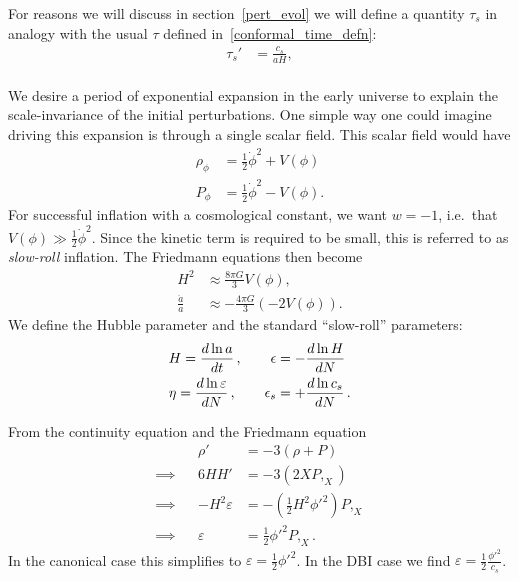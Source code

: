     For reasons we will discuss in section~\ref{pert_evol} we will
    define a quantity $\tau_s$
    in analogy with the usual $\tau$ defined in~\eqref{conformal_time_defn}:
    \begin{align}\label{tausdef}
        \tau_s'&=\frac{c_s}{aH},\\
    \end{align}


    We desire a period of exponential expansion in the early universe to explain the
    scale-invariance of the initial perturbations.
    One simple way one could imagine driving this expansion is through a single
    scalar field. This scalar field would have
    \begin{align}
        \rho_\phi &= \frac{1}{2}\dot{\phi}^2+V(\phi)\\
        P_\phi &= \frac{1}{2}\dot{\phi}^2-V(\phi).
    \end{align}
    For successful inflation with a cosmological constant, we want $w=-1$,
    i.e.\ that $V(\phi)\gg\frac{1}{2}\dot{\phi}^2$. Since the kinetic term is required to
    be small, this is referred to as \textit{slow-roll} inflation.
    The Friedmann equations then become
    \begin{align}
        H^2 &\approx \frac{8\pi G}{3}V(\phi),\\
        \frac{\ddot{a}}{a} &\approx -\frac{4\pi G}{3}\left(-2V(\phi)\right).
    \end{align}
We define the Hubble parameter and the standard ``slow-roll'' parameters:
\begin{equation}
\label{slowrollparams}
\begin{split}
    H = \frac{d\ln a}{dt}	\,,
    \qquad
    \epsilon &= -\frac{d\ln H}{dN}	\\
    \eta = \frac{d\ln \varepsilon}{dN}	\,,
    \qquad
    \epsilon_s &= +\frac{d\ln c_s}{dN}	\,.
\end{split}
\end{equation}

From the continuity equation and the Friedmann equation
\begin{align}
    &&\rho' &= -3(\rho+P)\\
    \implies&&6HH' &= -3(2X P,_{X})\\
    \implies&&-H^2\varepsilon &= -\left(\frac{1}{2}H^2{\phi'}^2\right) P,_{X}\\
    \implies&&\varepsilon &= \frac{1}{2}{\phi'}^2 P,_{X}.
\end{align}
In the canonical case this simplifies to
$\varepsilon = \frac{1}{2}{\phi'}^2$.
In the DBI case we find
$\varepsilon = \frac{1}{2}\frac{{\phi'}^2}{c_s}$.

